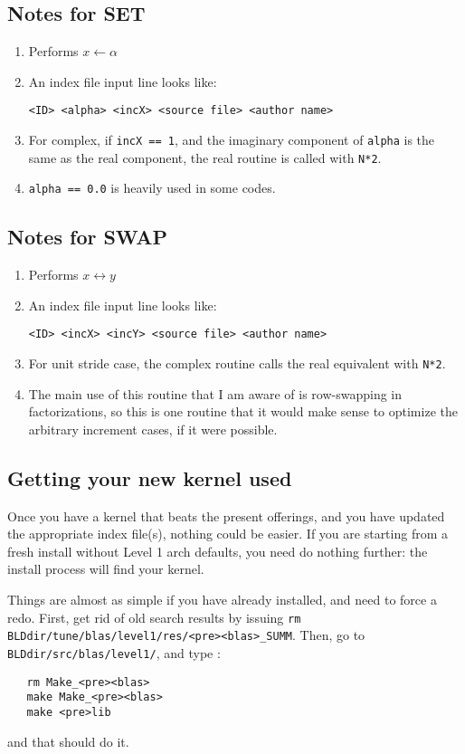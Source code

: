 \documentclass[11pt]{article}
\begin{document}
\subsection{Notes for SET}
\begin{enumerate}
\item Performs $ x \leftarrow \alpha $
\item An index file input line looks like:
\begin{verbatim}
<ID> <alpha> <incX> <source file> <author name>
\end{verbatim}
\item For complex, if {\tt incX == 1}, and the imaginary component of
      {\tt alpha} is the same as the real component, the real routine
      is called with {\tt N*2}.
\item {\tt alpha == 0.0} is heavily used in some codes.
\end{enumerate}

\subsection{Notes for SWAP}
\begin{enumerate}
\item Performs $x \leftrightarrow y$
\item An index file input line looks like:
\begin{verbatim}
<ID> <incX> <incY> <source file> <author name>
\end{verbatim}
\item For unit stride case, the complex routine calls the real equivalent
      with {\tt N*2}.
\item The main use of this routine that I am aware of is row-swapping in 
      factorizations, so this is one routine that it would make sense to
      optimize the arbitrary increment cases, if it were possible.
\end{enumerate}

\subsection{Getting your new kernel used}
Once you have a kernel that beats the present offerings, and you have
updated the appropriate index file(s), nothing could be easier.  
If you are starting from a fresh install without Level 1 arch defaults,
you need do nothing further: the install process will find your kernel.

Things are almost as simple if you have already installed, and need to
force a redo.  First, get rid of old search results by issuing
{\tt rm BLDdir/tune/blas/level1/res/<pre><blas>\_SUMM}.
Then, go to {\tt BLDdir/src/blas/level1/}, and type :
\begin{verbatim}
   rm Make_<pre><blas>
   make Make_<pre><blas>
   make <pre>lib
\end{verbatim}
and that should do it.
\end{document}
